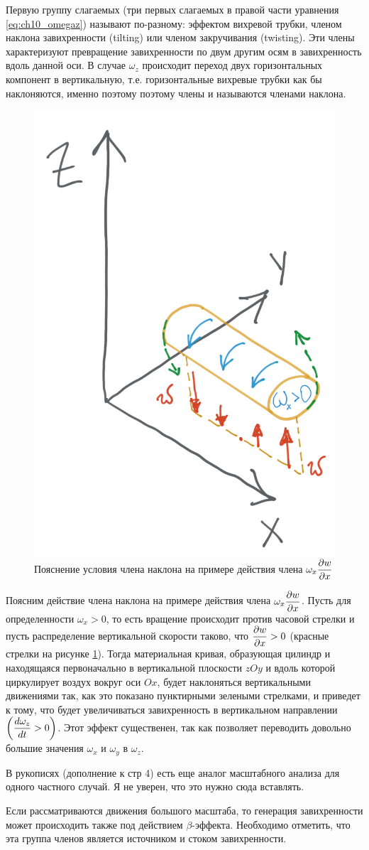 Первую группу слагаемых (три первых слагаемых в правой части уравнения \ref{eq:ch10_omegaz}) называют по-разному: эффектом вихревой трубки, членом наклона завихренности (tilting) или членом закручивания (twisting). Эти члены характеризуют превращение завихренности по двум другим осям в завихренность вдоль данной оси. В случае $\omega_z$ происходит переход двух горизонтальных компонент в вертикальную, т.е. горизонтальные вихревые трубки как бы наклоняются, именно поэтому поэтому члены и называются членами наклона. 

    \begin{figure}[h]
    \centering
    \includegraphics[width=0.5\linewidth]{pics/ch10.1.png}
    \caption{\label{fig:ch10.1}
    Пояснение условия члена наклона на примере действия члена $\omega_x\displaystyle\frac{\partial w}{\partial x}$
    }
    \end{figure}    

Поясним действие члена наклона на примере действия члена $\omega_x\displaystyle\frac{\partial w}{\partial x}$. Пусть для определенности $\omega_x > 0$, то есть вращение происходит против часовой стрелки и пусть распределение вертикальной скорости таково, что $\displaystyle\frac{\partial w}{\partial x}>0$ (красные стрелки на рисунке \ref{fig:ch10.1}). Тогда материальная кривая, образующая цилиндр и находящаяся первоначально в вертикальной плоскости $zOy$ и вдоль которой циркулирует воздух вокруг оси $Ox$, будет наклоняться вертикальными движениями так, как это показано пунктирными зелеными стрелками, и приведет к тому, что будет увеличиваться завихренность в вертикальном направлении $\left( \displaystyle\frac{d \omega_z}{d t}>0 \right)$. Этот эффект существенен, так как позволяет переводить довольно большие значения $\omega_x$ и $\omega_y$ в $\omega_z$. 
\begin{warn}
    В рукописях (дополнение к стр 4) есть еще аналог масштабного анализа для одного частного случай. Я не уверен, что это нужно сюда вставлять.
\end{warn}
Если рассматриваются движения большого масштаба, то генерация завихренности может происходить также под действием $\beta$-эффекта. Необходимо отметить, что эта группа членов является источником и стоком завихренности.

